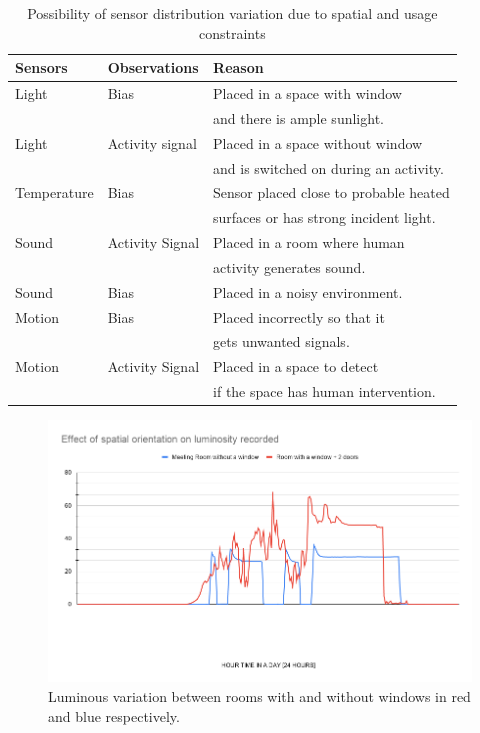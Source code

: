 \documentclass[conference]{IEEEtran}
\begin{document}
\begin{table}[]
\caption{Possibility of sensor distribution variation due to spatial and usage constraints }
\label{table:datadistribution}
\begin{tabular}{|l|l|l|}
\hline
Sensors     & Observations    & Reason                                                                         \\ \hline
Light       & Bias            & Placed in a space with window \\
&   &   and there is ample sunlight.                     \\ \hline
Light       & Activity signal & Placed in a space without window \\
&   &    and is switched on during an activity.     \\ \hline
Temperature & Bias            & Sensor placed close to probable heated \\
&   &   surfaces or has strong incident light. \\ \hline
Sound       & Activity Signal & Placed in a room where human \\
&   &   activity generates sound.                         \\ \hline
Sound       & Bias            & Placed in a noisy environment. \\ \hline
Motion      & Bias            & Placed incorrectly so that it \\
&   &   gets unwanted signals.                           \\ \hline
Motion      & Activity Signal & Placed in a space to detect \\
&   &    if the space has human intervention.               \\ \hline
\end{tabular}
\end{table}

\begin{figure}
\centering
  \includegraphics[width=1\linewidth]{./img/luxDayComparison.png}
  \caption{ Luminous variation between rooms with and without windows in red and blue respectively.}
  \label{fig:luxComparison}
\end{figure}
\end{document}
